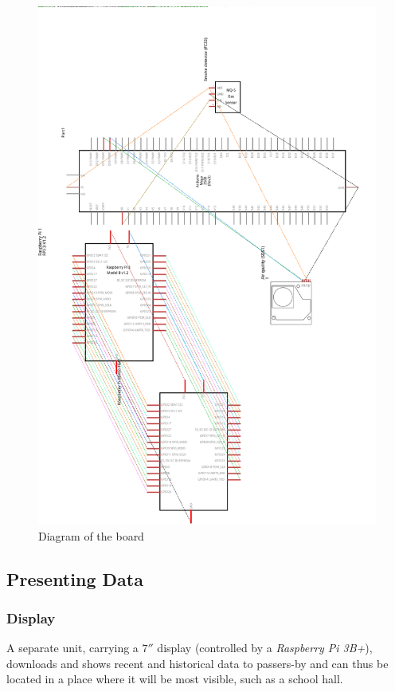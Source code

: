 \documentclass[12pt, a4paper]{article}
\begin{document}
\begin{figure}[!h]
	\centering
	\includegraphics[height=0.95\textheight]{schema.png}
	\caption{Diagram of the board}
	\label{fig:schema}
\end{figure}
\clearpage

\subsection{Presenting Data}
\subsubsection{Display}
A separate unit, carrying a $7''$ display (controlled by a \emph{Raspberry Pi 3B+}), downloads and shows recent and historical data to passers-by and can thus be located in a place where it will be most visible, such as a school hall.\\
\end{document}
